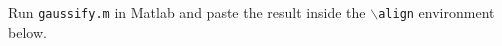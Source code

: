 \documentclass{scrartcl}
\begin{document}
Run \texttt{gaussify.m} in Matlab and paste the result inside the \texttt{$\backslash$align} environment below.
\begin{align*}\nonumber
\end{align*}
\end{document}

